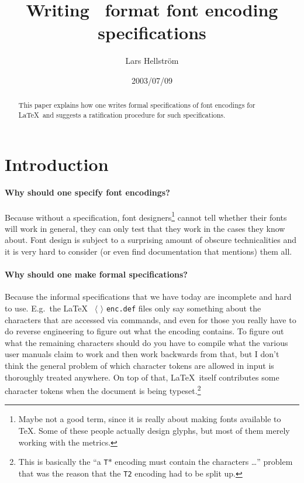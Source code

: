 \documentclass[a4paper]{article}
\title{Writing \ETX\ format font encoding specifications}
\author{Lars Hellstr\"om}
\date{2003/07/09}
\makeatletter
\DeclareRobustCommand\meta[1]{%
   \ensuremath{\langle}%
   \sbox{\z@}{%
      \setlanguage\l@nohyphenation
      \normalfont\itshape #1\/%
      \setlanguage\language
   }%
   \unhbox\z@
   \ensuremath{\rangle}%
}
\makeatother
\begin{document}
\maketitle

\begin{abstract}
  This paper explains how one writes formal specifications of font 
  encodings for \LaTeX\ and suggests a ratification procedure for such 
  specifications.
\end{abstract}


\tableofcontents

\vspace{0mm plus 35mm}
\pagebreak[2]


\section{Introduction}

\paragraph*{Why should one specify font encodings?}
Because without a specification, font 
designers\footnote{Maybe not a good term, since it is really about 
making fonts available to \TeX. Some of these people actually 
design glyphs, but most of them merely working with the metrics.} 
cannot tell whether their fonts will work in general, they can 
only test that they work in the cases they know about. Font design 
is subject to a surprising amount of obscure technicalities and it 
is very hard to consider (or even find documentation that 
mentions) them all.
    
\paragraph*{Why should one make formal specifications?}
Because the informal specifications that we have today 
are incomplete and hard to use. E.g.\ the \LaTeX\ 
\meta{enc}\texttt{enc.def} files only say something about the 
characters that are accessed via commands, and even for those you 
really have to do reverse engineering to figure out what the 
encoding contains. To figure out what the remaining characters 
should do you have to compile what the various user manuals claim 
to work and then work backwards from that, but I don't think the 
general problem of which character tokens are allowed in input is 
thoroughly treated anywhere. On top of that, \LaTeX\ itself 
contributes some character tokens when the document is being 
typeset.\footnote{This is basically the ``a \texttt{T}$*$ encoding 
must contain the characters \ldots'' problem that was the reason 
that the \texttt{T2} encoding had to be split up.}
\end{document}
